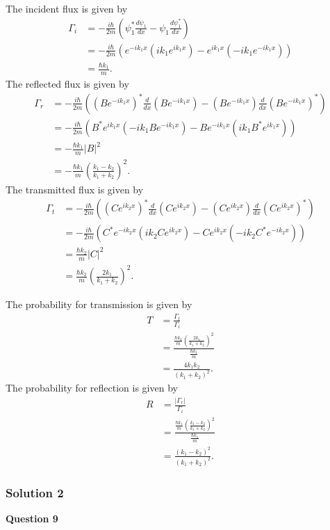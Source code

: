 \documentclass{article}
\begin{document}
The incident flux is given by
\begin{align*}
\Gamma_i &= -\frac{i\hbar}{2m} \left( \psi_1^* \frac{d\psi_1}{dx} - \psi_1 \frac{d\psi_1^*}{dx} \right) \\
&= -\frac{i\hbar}{2m} \left( e^{-ik_1x} (ik_1 e^{ik_1x}) - e^{ik_1x} (-ik_1 e^{-ik_1x}) \right) \\
&= \frac{\hbar k_1}{m}.
\end{align*}
The reflected flux is given by
\begin{align*}
\Gamma_r &= -\frac{i\hbar}{2m} \left( (Be^{-ik_1x})^* \frac{d}{dx}(Be^{-ik_1x}) - (Be^{-ik_1x}) \frac{d}{dx}(Be^{-ik_1x})^* \right) \\
&= -\frac{i\hbar}{2m} \left( B^* e^{ik_1x} (-ik_1 B e^{-ik_1x}) - B e^{-ik_1x} (ik_1 B^* e^{ik_1x}) \right) \\
&= -\frac{\hbar k_1}{m} |B|^2 \\
&= -\frac{\hbar k_1}{m} \left( \frac{k_1 - k_2}{k_1 + k_2} \right)^2.
\end{align*}
The transmitted flux is given by
\begin{align*}
\Gamma_t &= -\frac{i\hbar}{2m} \left( (Ce^{ik_2x})^* \frac{d}{dx}(Ce^{ik_2x}) - (Ce^{ik_2x}) \frac{d}{dx}(Ce^{ik_2x})^* \right) \\
&= -\frac{i\hbar}{2m} \left( C^* e^{-ik_2x} (ik_2 C e^{ik_2x}) - C e^{ik_2x} (-ik_2 C^* e^{-ik_2x}) \right) \\
&= \frac{\hbar k_2}{m} |C|^2 \\
&= \frac{\hbar k_2}{m} \left( \frac{2k_1}{k_1 + k_2} \right)^2.
\end{align*}

The probability for transmission is given by
\begin{align*}
T &= \frac{\Gamma_t}{\Gamma_i} \\
&= \frac{\frac{\hbar k_2}{m} \left( \frac{2k_1}{k_1 + k_2} \right)^2}{\frac{\hbar k_1}{m}} \\
&= \frac{4k_1k_2}{(k_1 + k_2)^2}.
\end{align*}
The probability for reflection is given by
\begin{align*}
R &= \frac{|\Gamma_r|}{\Gamma_i} \\
&= \frac{\frac{\hbar k_1}{m} \left( \frac{k_1 - k_2}{k_1 + k_2} \right)^2}{\frac{\hbar k_1}{m}} \\
&= \frac{(k_1 - k_2)^2}{(k_1 + k_2)^2}.
\end{align*}


\subsubsection{Solution 2}
\textbf{Question 9}
\end{document}
